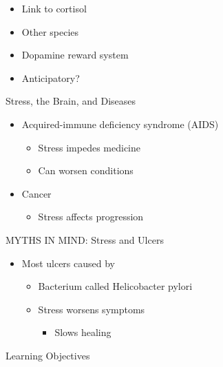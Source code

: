 \documentclass[
]{book}
\providecommand{\tightlist}{%
  \setlength{\itemsep}{0pt}\setlength{\parskip}{0pt}}
\begin{document}
\begin{reflect}
\begin{itemize}
  \begin{itemize}
  \tightlist
  \item
    Link to cortisol\\
  \item
    Other species\\
  \item
    Dopamine reward system\\
  \item
    Anticipatory?
  \end{itemize}
\end{itemize}

Stress, the Brain, and Diseases

\begin{itemize}
\tightlist
\item
  Acquired-immune deficiency syndrome (AIDS)

  \begin{itemize}
  \tightlist
  \item
    Stress impedes medicine\\
  \item
    Can worsen conditions\\
  \end{itemize}
\item
  Cancer

  \begin{itemize}
  \tightlist
  \item
    Stress affects progression
  \end{itemize}
\end{itemize}

MYTHS IN MIND: Stress and Ulcers

\begin{itemize}
\tightlist
\item
  Most ulcers caused by

  \begin{itemize}
  \tightlist
  \item
    Bacterium called Helicobacter pylori\\
  \item
    Stress worsens symptoms

    \begin{itemize}
    \tightlist
    \item
      Slows healing
    \end{itemize}
  \end{itemize}
\end{itemize}

Learning Objectives


\end{reflect}
\end{document}
